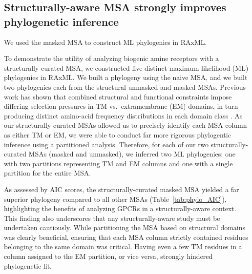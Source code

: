 \documentclass[fleqn,10pt]{wlpeerj}
\begin{document}
\subsection*{Structurally-aware MSA strongly improves phylogenetic inference}

We used the masked MSA to construct ML phylogenies in RAxML. 

To demonstrate the utility of analyzing biogenic amine receptors with a structurally-curated MSA, we constructed five distinct maximum likelihood (ML) phylogenies in RAxML. We built a phylogeny using the naive MSA, and we built two phylogenies each from the structural unmasked and masked MSAs. Previous work has shown that combined structural and functional constraints impose differing selection pressures in TM vs.\ extramembrane (EM) domains, in turn producing distinct amino-acid frequency distributions in each domain class \citep{Tourasse2000,Stevens2001,Julenius2006,Oberai2009,SpielmanWilke2013,FranzosaXueXia2013}. As our structurally-curated MSAs allowed us to precisely identify each MSA column as either TM or EM, we were able to conduct far more rigorous phylogentic inference using a partitioned analysis. Therefore, for each of our two structurally-curated MSAs (masked and unmasked), we inferred two ML phylogenies: one with two partitions representing TM and EM columns and one with a single partition for the entire MSA. 

As assessed by AIC scores, the structurally-curated masked MSA yielded a far superior phylogeny compared to all other MSAs (Table~\ref{tab:phylo_AIC}), highlighting the benefits of analyzing GPCRs in a structurally-aware context. This finding also underscores that any structurally-aware study must be undertaken cautiously. While partitioning the MSA based on structural domains was clearly beneficial, ensuring that each MSA column strictly contained residues belonging to the same domain was critical. Having even a few TM residues in a column assigned to the EM partition, or vice versa, strongly hindered phylogenetic fit.
\end{document}
